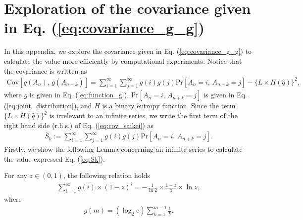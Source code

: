 \newpage
\section{Exploration of the covariance given in Eq. (\ref{eq:covariance_g_g})}\label{appendix:B}
In this appendix, we explore the covariance given in Eq. (\ref{eq:covariance_g_g}) to calculate the value more efficiently by computational experiments. Notice that the covariance is written as 
\begin{align}\label{eq:cov_saikei}
	\mathrm{Cov}[g(A_n),\, g(A_{n+k})] 
	= \sum_{i=1}^{\infty} \sum_{j=1}^{\infty} g(i) g(j) \mathrm{Pr} \left[ A_n=i,\,A_{n+k}=j \right] - \{L\times H(\hat{q})\}^2,
\end{align}
where $g$ is given in Eq. (\ref{eq:function_g}), $\mathrm{Pr} \left[ A_n=i,\,A_{n+k}=j \right]$ is given in Eq. (\ref{eq:joint_distribution}), and $H$ is a binary entropy function.
%
Since the term $\{L\times H(\hat{q})\}^2$ is irrelevant to an infinite series, we write the first term of the right hand side (r.h.s.) of Eq. (\ref{eq:cov_saikei}) as
%
%
\begin{align}\label{eq:Sk}
	\overline{S}_{k} := \sum_{i=1}^{\infty} \sum_{j=1}^{\infty} g(i) g(j) \mathrm{Pr} \left[ A_n=i,\,A_{n+k}=j \right].
\end{align}
%
Firstly, we show the following Lemma concerning an infinite series to calculate the value expressed Eq. (\ref{eq:Sk}). 
%
\begin{lemma}\label{lemma:1}
For any $z \in (0,1)$, the following relation holds
\begin{align}\label{eq:infinite_series}
	\sum_{i=1}^{\infty} g(i) \times (1-z)^i = -\frac{1}{\ln 2} \times \frac{1-z}{z} \times \ln z,
\end{align}
where
\begin{align}
	g(m) = (\log_2 \mathrm{e}) \sum_{k=1}^{m-1} \frac{1}{k}.
\end{align}
\end{lemma}
%
